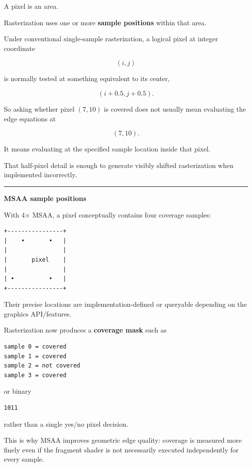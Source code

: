 A pixel is an area.

Rasterization uses one or more \textbf{sample positions} within that area.

Under conventional single-sample rasterization, a logical pixel at integer coordinate

\[
(i,j)
\]

is normally tested at something equivalent to its center,

\[
(i+0.5,j+0.5).
\]

So asking whether pixel \((7,10)\) is covered does not usually mean evaluating the edge equations at

\[
(7,10).
\]

It means evaluating at the specified sample location inside that pixel.

That half-pixel detail is enough to generate visibly shifted rasterization when implemented incorrectly.

\begin{center}\rule{0.5\linewidth}{0.5pt}\end{center}

\textbf{MSAA sample positions}

With 4× MSAA, a pixel conceptually contains four coverage samples:

\begin{verbatim}
+----------------+
|    •       •   |
|                |
|       pixel    |
|                |
| •          •   |
+----------------+
\end{verbatim}

Their precise locations are implementation-defined or queryable depending on the graphics API/features.

Rasterization now produces a \textbf{coverage mask} such as

\begin{verbatim}
sample 0 = covered
sample 1 = covered
sample 2 = not covered
sample 3 = covered
\end{verbatim}

or binary

\begin{verbatim}
1011
\end{verbatim}

rather than a single yes/no pixel decision.

This is why MSAA improves geometric edge quality: coverage is measured more finely even if the fragment shader is not necessarily executed independently for every sample.

